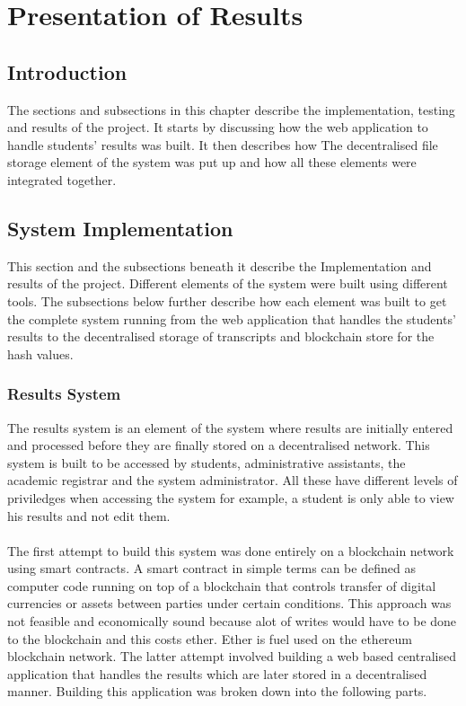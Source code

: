 \chapter{Presentation of Results}
\section{Introduction}
The sections and subsections in this chapter describe the implementation, testing and results of the project. It starts by discussing how the web application to handle students' results was built. It then describes how The decentralised file storage element of the system was put up and how all these elements were integrated together.

\section{System Implementation}
This section and the subsections beneath it describe the Implementation and results of the project. Different elements of the system were built using different tools. The subsections below further describe how each element was built to get the complete system running from the web application that handles the students' results to the decentralised storage of transcripts and blockchain store for the hash values.

\subsection{Results System}
The results system is an element of the system where results are initially entered and processed before they are finally stored on a decentralised network. This system is built to be accessed by students, administrative assistants, the academic registrar and the system administrator. All these have different levels of priviledges when accessing the system for example, a student is only able to view his results and not edit them. \\~\\
The first attempt to build this system was done entirely on a blockchain network using smart contracts. A smart contract in simple terms can be defined as computer code running on top of a blockchain that controls transfer of digital currencies or assets between parties under certain conditions\cite{20}. This approach was not feasible and economically sound because alot of writes would have to be done to the blockchain and this costs ether. Ether is fuel used on the ethereum blockchain network. The latter attempt involved building a web based centralised application that handles the results which are later stored in a decentralised manner. Building this application was broken down into the following parts.

